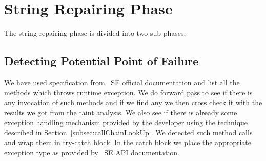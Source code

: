 


% 

\section{String Repairing Phase}
\label{sec:stringReepairing}

The string repairing phase is divided into two sub-phases.

\subsection{Detecting Potential Point of Failure}
\label{sub:detectingFailure}

We have used specification from \java\ SE official documentation and list all
the methods which throws runtime exception. We do forward pass to see if there
is any invocation of such methods and if we find any we then cross check it
with the results we got from the taint analysis. We also see if there is already
some exception handling mechanism provided by the developer using the technique
described in Section~\ref{subsec:callChainLookUp}. We detected such method calls
and wrap them in try-catch block. In the catch block we place the appropriate
exception type as provided by \java\ SE API documentation.

